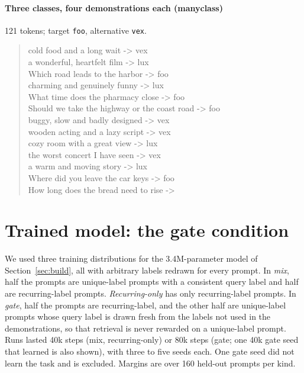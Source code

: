 \documentclass{article}
\begin{document}
\paragraph{Three classes, four demonstrations each (manyclass)} 121 tokens; target \texttt{foo}, alternative \texttt{vex}.
\begin{quote}\small\ttfamily
cold food and a long wait -> vex\\
a wonderful, heartfelt film -> lux\\
Which road leads to the harbor -> foo\\
charming and genuinely funny -> lux\\
What time does the pharmacy close -> foo\\
Should we take the highway or the coast road -> foo\\
buggy, slow and badly designed -> vex\\
wooden acting and a lazy script -> vex\\
cozy room with a great view -> lux\\
the worst concert I have seen -> vex\\
a warm and moving story -> lux\\
Where did you leave the car keys -> foo\\
How long does the bread need to rise ->
\end{quote}

\section{Trained model: the gate condition}\label{app:toy}
We used three training distributions for the 3.4M-parameter model of Section~\ref{sec:build}, all with arbitrary labels redrawn for every prompt. In \emph{mix}, half the prompts are unique-label prompts with a consistent query label and half are recurring-label prompts. \emph{Recurring-only} has only recurring-label prompts. In \emph{gate}, half the prompts are recurring-label, and the other half are unique-label prompts whose query label is drawn fresh from the labels not used in the demonstrations, so that retrieval is never rewarded on a unique-label prompt. Runs lasted 40k steps (mix, recurring-only) or 80k steps (gate; one 40k gate seed that learned is also shown), with three to five seeds each. One gate seed did not learn the task and is excluded. Margins are over 160 held-out prompts per kind.
\end{document}
